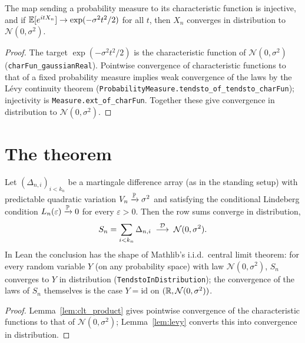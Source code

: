 \begin{lemma}\label{lem:levy}
The map sending a probability measure to its characteristic function is injective,
and if $\mathbb{E}[e^{itX_n}]\to\exp(-\sigma^2 t^2/2)$ for all $t$, then $X_n$ converges in
distribution to $\mathcal{N}(0,\sigma^2)$.
\end{lemma}

\begin{proof}
The target $\exp(-\sigma^2 t^2/2)$ is the characteristic function of
$\mathcal N(0,\sigma^2)$ (\texttt{charFun\_gaussianReal}). Pointwise convergence
of characteristic functions to that of a fixed probability measure implies weak
convergence of the laws by the L\'evy continuity theorem
(\texttt{ProbabilityMeasure.tendsto\_of\_tendsto\_charFun}); injectivity is
\texttt{Measure.ext\_of\_charFun}. Together these give convergence in distribution
to $\mathcal N(0,\sigma^2)$.
\end{proof}

\section{The theorem}
\label{sec:pre_clt_thm}

\begin{theorem}\label{thm:mart_clt}
\leanok
{}
Let $(\Delta_{n,i})_{i<k_n}$ be a martingale difference array (as in the standing
setup) with predictable quadratic variation $V_n\xrightarrow{\mathbb{P}}\sigma^2$ and
satisfying the conditional Lindeberg condition
$L_n(\varepsilon)\xrightarrow{\mathbb{P}}0$ for every $\varepsilon>0$. Then the row sums
converge in distribution,
\[
  S_n=\sum_{i<k_n}\Delta_{n,i} \;\overset{\mathcal{D}}{\longrightarrow}\; \mathcal{N}(0,\sigma^2).
\]
In Lean the conclusion has the shape of Mathlib's i.i.d.\ central limit theorem: for every random
variable $Y$ (on any probability space) with law $\mathcal N(0,\sigma^2)$, $S_n$ converges to $Y$
in distribution (\texttt{TendstoInDistribution}); the convergence of the laws of $S_n$ themselves
is the case $Y=\mathrm{id}$ on $(\mathbb{R},\mathcal N(0,\sigma^2))$.
\end{theorem}

\begin{proof}\leanok
{}
Lemma~\ref{lem:clt_product} gives pointwise convergence of the characteristic
functions to that of $\mathcal N(0,\sigma^2)$; Lemma~\ref{lem:levy} converts this
into convergence in distribution.
\end{proof}

